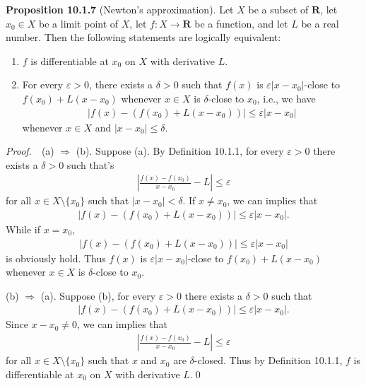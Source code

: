 \documentclass{book}
\newcommand{\pff}{\vspace{.25em}\noindent\emph{Proof.}~~}
\newcommand{\titl}[1]{\noindent\textbf{#1}}
\begin{document}
\begin{framed}
\titl{Proposition 10.1.7} (Newton's approximation). Let $X$ be a subset of $\mathbf{R}$, let $x_0\in X$ be a limit point of $X$, let $f:X\to\mathbf{R}$ be a function, and let $L$ be a real number. Then the following statements are logically equivalent:
\begin{enumerate}
    \item $f$ is differentiable at $x_0$ on $X$ with derivative $L$.
    \item For every $\varepsilon>0$, there exists a $\delta>0$ such that $f(x)$ is $\varepsilon|x−x_0|$-close to $f(x_0)+L(x−x_0)$ whenever $x\in X$ is $\delta$-close to $x_0$, i.e., we have
            \begin{align*}
                |f(x)-(f(x_0)+L(x−x_0))|\leq\varepsilon|x−x_0|
            \end{align*}
    whenever $x\in X$ and $|x-x_0|\leq\delta$.
\end{enumerate}
\end{framed}

\pff (a) $\Rightarrow$ (b). Suppose (a). By Definition 10.1.1, for every $\varepsilon>0$ there exists a $\delta>0$ such that’s
    \begin{align*}
        \left|\frac{f(x)-f(x_0)}{x-x_0}-L\right|\leq\varepsilon
    \end{align*}
for all $x\in X\setminus\{x_0\}$ such that $|x-x_0|<\delta$. If $x\neq x_0$, we can implies that
    \begin{align*}
        |f(x)-(f(x_0)+L(x-x_0))|\leq\varepsilon|x-x_0|.
    \end{align*}
While if $x=x_0$,
    \begin{align*}
        |f(x)-(f(x_0)+L(x-x_0))|\leq\varepsilon|x-x_0|
    \end{align*}
is obviously hold. Thus $f(x)$ is $\varepsilon|x−x_0|$-close to $f(x_0)+L(x−x_0)$ whenever $x\in X$ is $\delta$-close to $x_0$.

(b) $\Rightarrow$ (a). Suppose (b), for every $\varepsilon>0$ there exists a $\delta>0$ such that
    \begin{align*}
        |f(x)-(f(x_0)+L(x-x_0))|\leq\varepsilon|x-x_0|.
    \end{align*}
Since $x-x_0\neq 0$, we can implies that
    \begin{align*}
        \left|\frac{f(x)-f(x_0)}{x-x_0}-L\right|\leq\varepsilon
    \end{align*}
for all $x\in X\setminus\{x_0\}$ such that $x$ and $x_0$ are $\delta$-closed. Thus by Definition 10.1.1, $f$ is differentiable at $x_0$ on $X$ with derivative $L$.\qed
\end{document}

